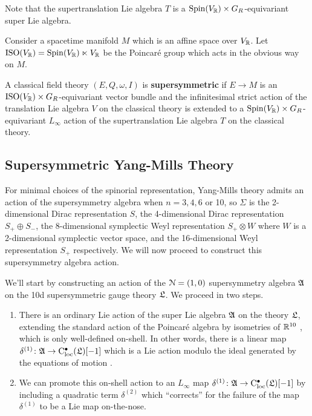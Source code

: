 \documentclass[10pt, oneside]{article}
\begin{document}
Note that the supertranslation Lie algebra $T$ is a $\mathrm{Spin}(V_\mathbb R)\times G_R$-equivariant super Lie algebra.

Consider a spacetime manifold $M$ which is an affine space over $V_\mathbb R$. Let $\mathrm{ISO}(V_\mathbb R) = \mathrm{Spin}(V_\mathbb R)\ltimes V_\mathbb R$ be the Poincar\'{e} group which acts in the obvious way on $M$.

\begin{dfn}
A classical field theory $(E, Q, \omega, I)$ is {\bf supersymmetric} if $E\rightarrow M$ is an $\mathrm{ISO}(V_\mathbb R)\times G_R$-equivariant vector bundle and the infinitesimal strict action of the translation Lie algebra $V$ on the classical theory is extended to a $\mathrm{Spin}(V_\mathbb R)\times G_R$-equivariant $L_\infty$ action of the supertranslation Lie algebra $T$ on the classical theory.
\end{dfn}

\subsection{Supersymmetric Yang-Mills Theory} \label{SUSY_action_section}
For minimal choices of the spinorial representation, Yang-Mills theory admits an action of the supersymmetry algebra when $n=3,4,6$ or 10, so $\Sigma$ is the 2-dimensional Dirac representation $S$, the 4-dimensional Dirac representation $S_+ \oplus S_-$, the 8-dimensional symplectic Weyl representation $S_+ \otimes W$ where $W$ is a 2-dimensional symplectic vector space, and the 16-dimensional Weyl representation $S_+$ respectively.  We will now proceed to construct this supersymmetry algebra action. 

We'll start by constructing an action of the $\mathcal{N}=(1,0)$ supersymmetry algebra $\mathfrak{A}$ on the 10d supersymmetric gauge theory $\mathfrak L$.  We proceed in two steps.
\begin{enumerate}
 \item There is an ordinary Lie action of the super Lie algebra $\mathfrak{A}$ on the theory $\mathfrak L$, extending the standard action of the Poincar\'e algebra by isometries of $\mathbb R^{10}$ , which is only well-defined on-shell.  In other words, there is a linear map $\delta^{(1)} \colon \mathfrak{A} \to {\rm C}_{\rm loc}^\bullet(\mathfrak L)[-1]$ which is a Lie action modulo the ideal generated by the equations of motion .
 \item We can promote this on-shell action to an $L_\infty$ map $\delta^{(1)} \colon \mathfrak{A} \to {\rm C}_{\rm loc}^\bullet(\mathfrak L)[-1]$ by including a quadratic term $\delta^{(2)}$ which ``corrects'' for the failure of the map $\delta^{(1)}$ to be a Lie map on-the-nose.
\end{enumerate}
\end{document}
